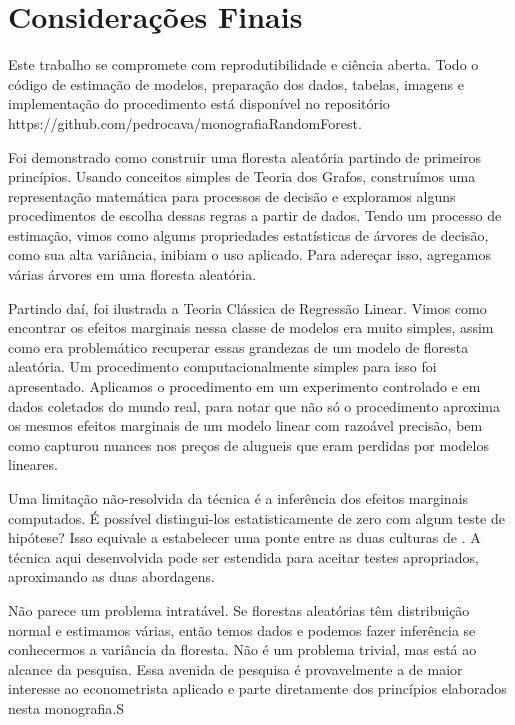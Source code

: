 \chapter{Considerações Finais}
\label{cap:conclusoes}

Este trabalho se compromete com reprodutibilidade e ciência aberta. Todo o código de estimação de modelos, preparação dos dados, tabelas, imagens e implementação do procedimento está disponível no repositório https://github.com/pedrocava/monografiaRandomForest. 


Foi demonstrado como construir uma floresta aleatória partindo de primeiros princípios. Usando conceitos simples de Teoria dos Grafos, construímos uma representação matemática para processos de decisão e exploramos alguns procedimentos de escolha dessas regras a partir de dados. Tendo um processo de estimação, vimos como algums propriedades estatísticas de árvores de decisão, como sua alta variância, inibiam o uso aplicado. Para adereçar isso, agregamos várias árvores em uma floresta aleatória.


Partindo daí, foi ilustrada a Teoria Clássica de Regressão Linear. Vimos como encontrar os efeitos marginais nessa classe de modelos era muito simples, assim como era problemático recuperar essas grandezas de um modelo de floresta aleatória. Um procedimento computacionalmente simples para isso foi apresentado. Aplicamos o procedimento em um experimento controlado e em dados coletados do mundo real, para notar que não só o procedimento aproxima os mesmos efeitos marginais de um modelo linear com razoável precisão, bem como capturou nuances nos preços de alugueis que eram perdidas por modelos lineares.


Uma limitação não-resolvida da técnica é a inferência dos efeitos marginais computados. É possível distingui-los estatisticamente de zero com algum teste de hipótese? Isso equivale a estabelecer uma ponte entre as duas culturas de . A técnica aqui desenvolvida pode ser estendida para aceitar testes apropriados, aproximando as duas abordagens.


Não parece um problema intratável. Se florestas aleatórias têm distribuição normal e estimamos várias, então temos dados e podemos fazer inferência se conhecermos a variância da floresta. Não é um problema trivial, mas está ao alcance da pesquisa. Essa avenida de pesquisa é provavelmente a de maior interesse ao econometrista aplicado e parte diretamente dos princípios elaborados nesta monografia.S





